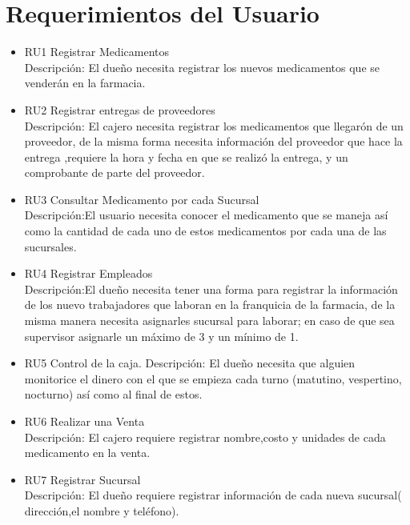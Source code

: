 \section{Requerimientos del Usuario}
\begin{itemize}

\item RU1 Registrar Medicamentos\\
Descripción: El dueño necesita registrar los nuevos medicamentos que se venderán en la farmacia.\\
\item RU2 Registrar entregas de proveedores\\
Descripción: El cajero necesita registrar los medicamentos que llegarón de un proveedor, de la misma forma necesita información del proveedor que hace la entrega ,requiere la hora y fecha en que se realizó la entrega, y un comprobante de parte del proveedor.\\

\item RU3 Consultar Medicamento por cada Sucursal\\
Descripción:El usuario necesita conocer el medicamento que se maneja así como la cantidad de cada uno de estos medicamentos por cada una de las sucursales.\\

\item RU4 Registrar Empleados\\
Descripción:El dueño necesita tener una forma para registrar la información de los nuevo trabajadores que laboran en la franquicia de la farmacia, de la misma manera necesita asignarles sucursal para laborar; en caso de que sea supervisor asignarle un máximo de 3 y un mínimo de 1.\\

\item RU5 Control de la caja.
Descripción: El dueño necesita que alguien monitorice el dinero con el que se empieza cada turno (matutino, vespertino, nocturno) así como al final de estos.\\

\item RU6 Realizar una Venta\\
Descripción: El cajero requiere registrar nombre,costo y unidades de cada medicamento en la venta.\\

\item RU7 Registrar Sucursal\\
Descripción: El dueño requiere registrar información de cada nueva sucursal( dirección,el nombre y teléfono).\\


\end{itemize}
